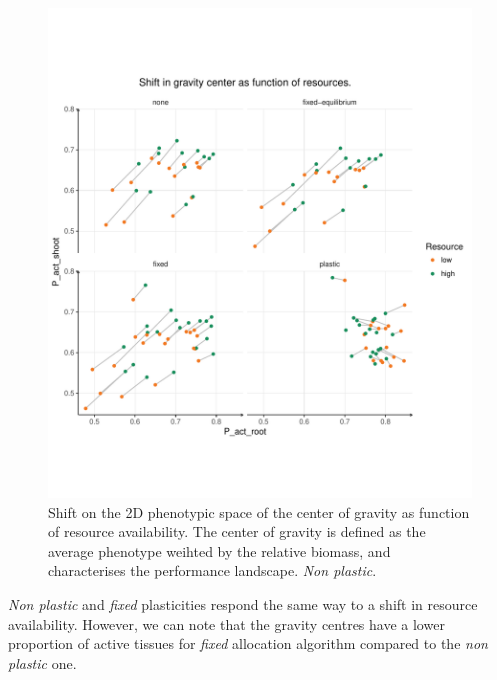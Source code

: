 \begin{figure}\label{fig:gravity_shift_resource}
\includegraphics[width = \textwidth]{./2_PP/Figures/Landscape/ld_gravity_resourceall.pdf}
\caption{Shift on the 2D phenotypic space of the center of gravity as function of resource availability. The center of gravity is defined as the average phenotype weihted by the relative biomass, and characterises the performance landscape. \textit{Non plastic}.}
\end{figure}

\textit{Non plastic} and \textit{fixed} plasticities respond the same way to a shift in resource availability. However, we can note that the gravity centres have a lower proportion of active tissues for \textit{fixed} allocation algorithm compared to the \textit{non plastic} one.

%
%
%
%
%
%

